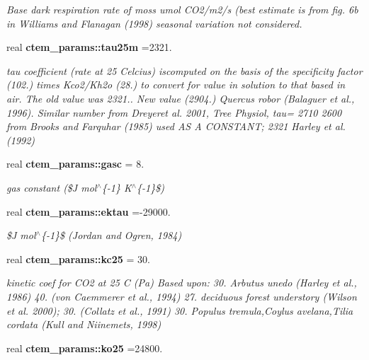 \begin{DoxyCompactItemize}
\begin{DoxyCompactList}\small\item\em Base dark respiration rate of moss umol C\+O2/m2/s (best estimate is from fig. 6b in Williams and Flanagan (1998) seasonal variation not considered. \end{DoxyCompactList}\item 
\hypertarget{namespacectem__params_a26fe22d544842a462db3a764fb43effd}{}real {\bfseries ctem\+\_\+params\+::tau25m} =2321.\label{namespacectem__params_a26fe22d544842a462db3a764fb43effd}

\begin{DoxyCompactList}\small\item\em tau coefficient (rate at 25 Celcius) iscomputed on the basis of the specificity factor (102.) times Kco2/\+Kh2o (28.) to convert for value in solution to that based in air. The old value was 2321.. New value (2904.) Quercus robor (Balaguer et al., 1996). Similar number from Dreyeret al. 2001, Tree Physiol, tau= 2710 2600 from Brooks and Farquhar (1985) used A\+S A C\+O\+N\+S\+T\+A\+N\+T; 2321 Harley et al. (1992) \end{DoxyCompactList}\item 
\hypertarget{namespacectem__params_a69dfc8466b8603dc7ce853efe2fbeb27}{}real {\bfseries ctem\+\_\+params\+::gasc} = 8.\label{namespacectem__params_a69dfc8466b8603dc7ce853efe2fbeb27}

\begin{DoxyCompactList}\small\item\em gas constant (\$\+J mol$^\wedge$\{-\/1\} K$^\wedge$\{-\/1\}\$) \end{DoxyCompactList}\item 
\hypertarget{namespacectem__params_ac7eca9b5a082ee77a63738607a2b453d}{}real {\bfseries ctem\+\_\+params\+::ektau} =-\/29000.\label{namespacectem__params_ac7eca9b5a082ee77a63738607a2b453d}

\begin{DoxyCompactList}\small\item\em \$\+J mol$^\wedge$\{-\/1\}\$ (Jordan and Ogren, 1984) \end{DoxyCompactList}\item 
\hypertarget{namespacectem__params_a4346f2333823e9b18ccb292128180726}{}real {\bfseries ctem\+\_\+params\+::kc25} = 30.\label{namespacectem__params_a4346f2333823e9b18ccb292128180726}

\begin{DoxyCompactList}\small\item\em kinetic coef for C\+O2 at 25 C (Pa) Based upon\+: 30. Arbutus unedo (Harley et al., 1986) 40. (von Caemmerer et al., 1994) 27. deciduous forest understory (Wilson et al. 2000); 30. (Collatz et al., 1991) 30. Populus tremula,Coylus avelana,Tilia cordata (Kull and Niinemets, 1998) \end{DoxyCompactList}\item 
\hypertarget{namespacectem__params_aeb7cdce1fb150241fa26098d767fe9dd}{}real {\bfseries ctem\+\_\+params\+::ko25} =24800.\label{namespacectem__params_aeb7cdce1fb150241fa26098d767fe9dd}


\end{DoxyCompactItemize}
